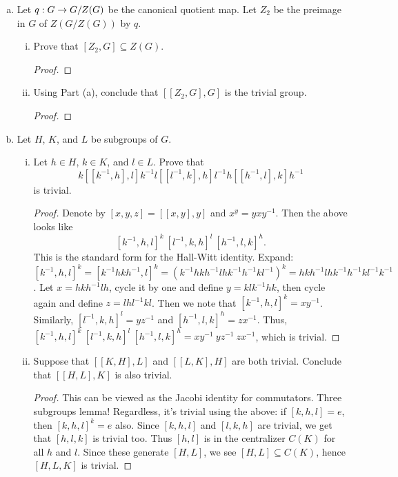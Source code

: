 \begin{itemize}
\begin{enumerate}[(a)]
\begin{enumerate}[(i)]
\begin{proof}
        \end{proof}
    \end{enumerate}



\item Let $q : G \rightarrow G/Z(G)$ be the canonical quotient map. Let $Z_2$ be the preimage
in $G$ of $Z(G/Z(G))$ by $q$.
    \begin{enumerate}[(i)]
        \item Prove that $[Z_2, G] \subseteq Z(G)$.
        \begin{proof}
        
        \end{proof}
        
        \item Using Part (a), conclude that $[[Z_2, G], G]$ is the trivial group.
        \begin{proof}

        \end{proof}
    \end{enumerate}

\item Let $H$, $K$, and $L$ be subgroups of $G$.
    \begin{enumerate}[(i)]
        \item Let $h \in H$, $k \in K$, and $l \in L$. Prove that
        $$k[[k^{-1}, h], l]k^{-1}l[[l^{-1}, k], h]l^{-1}h[[h^{-1}, l], k]h^{-1}$$
        is trivial.
        \begin{proof}
        Denote by $[x,y,z] = [[x, y], y]$ and $x^y = y x y^{-1}$. Then the above looks like
        $$[k^{-1},h,l]^k \ [l^{-1},k,h]^l \ [h^{-1},l,k]^h.$$
        This is the standard form for the Hall-Witt identity. Expand: $[k^{-1},h,l]^k = [k^{-1} h k h^{-1}, l]^k =  (k^{-1} h k h^{-1} l h k^{-1} h^{-1} k l^{-1})^k = h k h^{-1} l h k^{-1} h^{-1} k l^{-1} k^{-1}$. Let $x = h k h^{-1} l h$, cycle it by one and define $y = k l k^{-1} h k$, then cycle again and define $z = l h l^{-1} k l$. Then we note that $[k^{-1},h,l]^k = xy^{-1}$. Similarly, $[l^{-1},k,h]^l = yz^{-1}$ and $[h^{-1},l,k]^h = zx^{-1}$. Thus, $[k^{-1},h,l]^k \ [l^{-1},k,h]^l \ [h^{-1},l,k]^h = xy^{-1} \ yz^{-1} \ zx^{-1}$, which is trivial.
        \end{proof}
        
        \item Suppose that $[[K, H], L]$ and $[[L, K], H]$ are both trivial. Conclude that $[[H, L], K]$ is also trivial.
        \begin{proof}
            This can be viewed as the Jacobi identity for commutators. Three subgroups lemma! Regardless, it's trivial using the above: if $[k,h,l] = e$, then $[k,h,l]^k = e$ also. Since $[k,h,l]$ and $[l,k,h]$ are trivial, we get that $[h,l,k]$ is trivial too. Thus $[h,l]$ is in the centralizer $C(K)$ for all $h$ and $l$. Since these generate $[H,L]$, we see $[H,L] \subseteq C(K)$, hence $[H,L,K]$ is trivial.
        \end{proof}
    \end{enumerate}





\end{enumerate}
\end{itemize}
